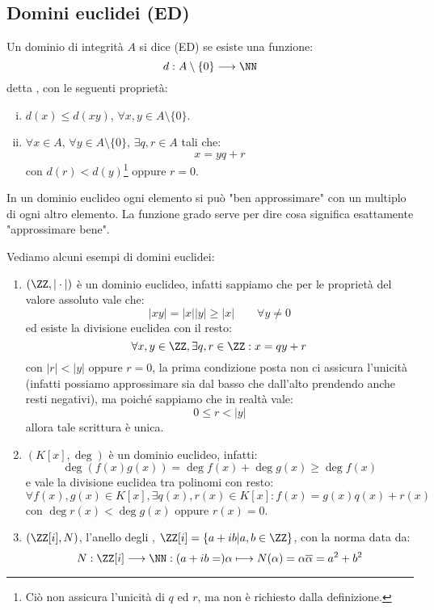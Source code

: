 \documentclass[11pt]{scrartcl}
\begin{document}
\subsection{Domini euclidei (ED)}
\begin{definition}
    Un dominio di integrità $A$ si dice  (ED) se esiste una funzione:
    \[ d : A \setminus\{0\} \longrightarrow \NN
        \]
    detta , con le seguenti proprietà:
    \begin{enumerate}[(i)]
        \item $d(x) \leq d(xy)$, $\forall x,y \in A \setminus\{0\}$.
        \item $\forall x \in A$, $\forall y \in A \setminus\{0\}$, $\exists q,r \in A$ tali che:
        \[ x = yq+r
            \]
        con $d(r) < d(y)$\footnote{Ciò non assicura l'unicità di $q$ ed $r$, ma non è richiesto dalla definizione.} oppure $r = 0$.
    \end{enumerate}
\end{definition}

\begin{remark}
    In un dominio euclideo ogni elemento si può "ben approssimare" con un multiplo di ogni altro elemento. La funzione
    grado serve per dire cosa significa esattamente "approssimare bene".
\end{remark}

\begin{example}
    Vediamo alcuni esempi di domini euclidei:
    \begin{enumerate}[(1)]
        \item $(\ZZ, |\cdot|)$ è un dominio euclideo, infatti sappiamo che per le proprietà del valore assoluto vale che:
        \[ |xy| = |x||y| \geq |x| \qquad \forall y \ne 0
            \]
        ed esiste la divisione euclidea con il resto:
        \[ \forall x,y \in \ZZ, \exists q,r \in \ZZ: x = qy + r
            \]
        con $|r| < |y|$ oppure $r = 0$, la prima condizione posta non ci assicura l'unicità (infatti possiamo approssimare sia dal basso che dall'alto 
        prendendo anche resti negativi), ma poiché sappiamo che in realtà vale:
        \[ 0 \leq r < |y|
            \]
        allora tale scrittura è unica.
        \item $(K[x],\deg)$ è un dominio euclideo, infatti:
        \[ \deg (f(x)g(x)) = \deg f(x) + \deg g(x) \geq \deg f(x)
            \]
        e vale la divisione euclidea tra polinomi con resto:
        \[ \forall f(x),g(x) \in K[x], \exists q(x),r(x)\in K[x] : f(x) = g(x)q(x) + r(x)
            \]
        con $\deg r(x) < \deg g(x)$ oppure $ r(x) = 0$.
        \item $(\ZZ[i],N)$, l'anello degli , $\ZZ[i] = \{a + ib | a,b \in \ZZ\}$, con la norma data da:
            \[ N : \ZZ[i] \longrightarrow \NN : (a +ib =)\alpha \longmapsto N(\alpha) = \alpha \overline{\alpha} = a^2+b^2
                \]
    \end{enumerate}
\end{example}
\end{document}
